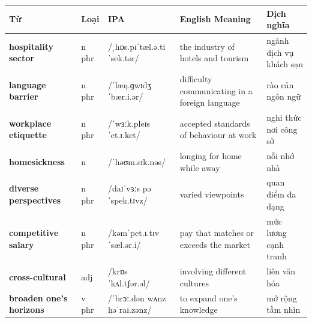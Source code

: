 \vspace{0.8em}
\begin{center}
\renewcommand{\arraystretch}{1.65}
\begin{tabularx}{\textwidth}{|V{0.22\textwidth}|C{0.07\textwidth}|I{0.20\textwidth}|Y|V{0.18\textwidth}|}
\hline
{}
\textbf{Từ} & \textbf{Loại} & \textbf{IPA} & \textbf{English Meaning} & \textbf{Dịch nghĩa} \\
\hline
\textbf{hospitality sector} & n phr & /ˌhɒs.pɪˈtæl.ə.ti ˈsek.tər/ & the industry of hotels and tourism & ngành dịch vụ khách sạn \\ \hline
\textbf{language barrier} & n phr & /ˈlæŋ.ɡwɪdʒ ˈbær.i.ər/ & difficulty communicating in a foreign language & rào cản ngôn ngữ \\ \hline
\textbf{workplace etiquette} & n phr & /ˈwɜːk.pleɪs ˈet.ɪ.ket/ & accepted standards of behaviour at work & nghi thức nơi công sở \\ \hline
\textbf{homesickness} & n & /ˈhəʊm.sɪk.nəs/ & longing for home while away & nỗi nhớ nhà \\ \hline
\textbf{diverse perspectives} & n phr & /daɪˈvɜːs pəˈspek.tɪvz/ & varied viewpoints & quan điểm đa dạng \\ \hline
\textbf{competitive salary} & n phr & /kəmˈpet.ɪ.tɪv ˈsæl.ər.i/ & pay that matches or exceeds the market & mức lương cạnh tranh \\ \hline
\textbf{cross-cultural} & adj & /krɒs ˈkʌl.tʃər.əl/ & involving different cultures & liên văn hóa \\ \hline
\textbf{broaden one's horizons} & v phr & /ˈbrɔː.dən wʌnz həˈraɪ.zənz/ & to expand one's knowledge & mở rộng tầm nhìn \\ \hline
\end{tabularx}
\end{center}

\newpage

